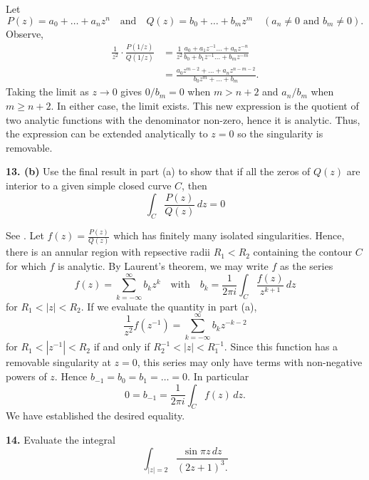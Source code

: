 \documentclass{homework}
\begin{document}
\begin{solution}
  Let
  $$
    P(z) = a_0 + \dots + a_nz^n\quad\text{and}\quad Q(z) = b_0 + \dots + b_mz^m\quad(a_n\not=0\text{ and }b_m\not=0).
  $$
  Observe,
  \begin{align*}
    \frac{1}{z^2} \cdot \frac{P(1/z)}{Q(1/z)}
    &= \frac{1}{z^2}\frac{a_0 + a_1z^{-1} \dots + a_nz^{-n}}{ b_0 + b_1z^{-1}\dots + b_mz^{-m} }\\
    &= \frac{a_0z^{m-2} + \dots + a_nz^{n-m-2}}{ b_0z^m + \dots + b_m }.
  \end{align*}
  Taking the limit as $z\to 0$ gives $0/b_m =0$ when $m>n+2$ and $a_n/b_m$ when $m\ge n+2$.  In either case, the limit exists. This new expression is the quotient of two analytic functions with the denominator non-zero, hence it is analytic. Thus, the expression can be extended analytically to $z=0$ so the singularity is removable. 
\end{solution}

{\bf 13. (b)} Use the final result in part (a) to show that if all the zeros of $Q(z)$ are interior to a given simple closed curve $C$, then
$$
  \int_{C} \frac{P(z)}{Q(z)}\, dz = 0
$$

\begin{solution}
See \cite[ch.~6.64, p.~228]{brown04}. Let $f(z) = \frac{P(z)}{Q(z)}$ which has
finitely many isolated singularities.  Hence, there is an annular region with
repsective radii $R_1<R_2$ containing the contour $C$ for which $f$ is
analytic. By Laurent's theorem, we may write $f$ as the series
$$
  f(z) = \sum_{k=-\infty}^\infty b_k z^k\quad
  \text{with}\quad
  b_k = \frac{1}{2\pi i}\int_C \frac{f(z)}{z^{k+1}}\,dz
$$
for $R_1<|z|<R_2$.
If we evaluate the quantity in part (a),
$$
  \frac{1}{z^2} f(z^{-1}) = \sum_{k=-\infty}^\infty b_kz^{-k-2}
$$
for $R_1< |z^{-1}|< R_2$ if and only if $R_2^{-1}<|z|<R_1^{-1}$.  Since this function has a removable singularity at $z=0$, this series may only have terms with non-negative powers of $z$.  Hence $b_{-1}=b_0=b_1=\dots=0$.  In particular
  $$
    0 = b_{-1} = \frac{1}{2\pi i}\int_{C} f(z)\,dz.
  $$
  We have established the desired equality.
\end{solution}

{{\bf 14.} Evaluate the integral
$$
  \int_{|z|=2}\frac{ \sin \pi z\, dz }{ (2z + 1)^3. }
$$}
\end{document}

